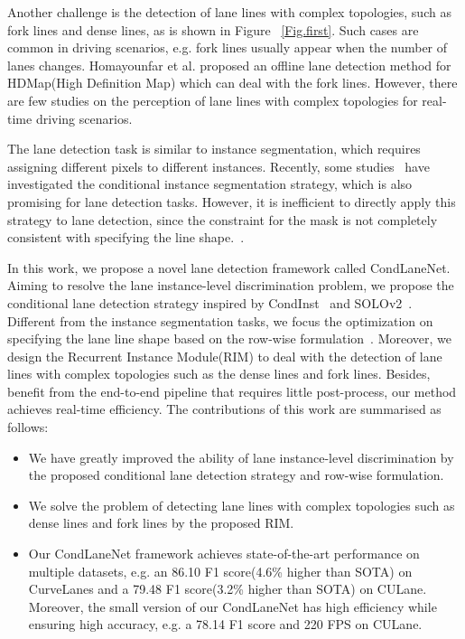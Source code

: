 \documentclass[10pt,twocolumn,letterpaper]{article}
\begin{document}
Another challenge is the detection of lane lines with complex topologies, such as fork lines and dense lines, as is shown in Figure ~\ref{Fig.first}. Such cases are common in driving scenarios, e.g. fork lines usually appear when the number of lanes changes. Homayounfar et al.\cite{homayounfar2019dagmapper} proposed an offline lane detection method for HDMap(High Definition Map) which can deal with the fork lines. However, there are few studies on the perception of lane lines with complex topologies for real-time driving scenarios.

The lane detection task is similar to instance segmentation, which requires assigning different pixels to different instances. Recently, some studies~\cite{tian2020conditional, wang2020solov2} have investigated the conditional instance segmentation strategy, which is also promising for lane detection tasks. However, it is inefficient to directly apply this strategy to lane detection, since the constraint for the mask is not completely consistent with specifying the line shape.~\cite{chougule2018reliable, tang2020review, qin2020ultra}. 

In this work, we propose a novel lane detection framework called CondLaneNet. Aiming to resolve the lane instance-level discrimination problem, we propose the conditional lane detection strategy inspired by CondInst~\cite{tian2020conditional} and SOLOv2~\cite{wang2020solov2}. Different from the instance segmentation tasks, we focus the optimization on specifying the lane line shape based on the row-wise formulation~\cite{qin2020ultra, yoo2020end}. Moreover, we design the Recurrent Instance Module(RIM) to deal with the detection of lane lines with complex topologies such as the dense lines and fork lines. Besides, benefit from the end-to-end pipeline that requires little post-process, our method achieves real-time efficiency. The contributions of this work are summarised as follows:

\begin{itemize}
    \item We have greatly improved the ability of lane instance-level discrimination by the proposed conditional lane detection strategy and row-wise formulation.
    \item We solve the problem of detecting lane lines with complex topologies such as dense lines and fork lines by the proposed RIM. 
    \item Our CondLaneNet framework achieves state-of-the-art performance on multiple datasets, e.g. an 86.10 F1 score(4.6\% higher than SOTA) on CurveLanes and a 79.48 F1 score(3.2\% higher than SOTA) on CULane. Moreover, the small version of our CondLaneNet has high efficiency while ensuring high accuracy, e.g. a 78.14 F1 score and 220 FPS on CULane.
\end{itemize}
\end{document}
